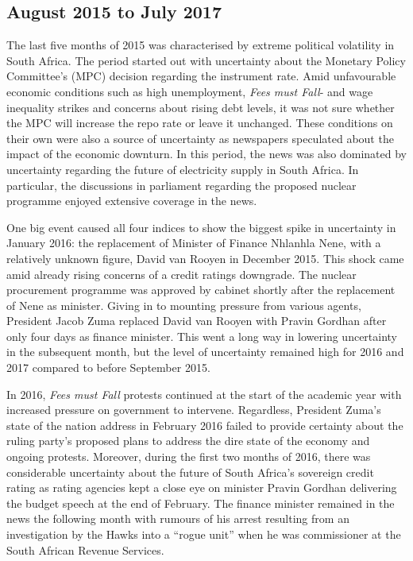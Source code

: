 \documentclass[11pt,preprint, authoryear]{elsarticle}
\numberwithin{equation}{section}
\numberwithin{figure}{section}
\numberwithin{table}{section}
\begin{document}
\subsection{August 2015 to July 2017}\label{ss_second_period}

The last five months of 2015 was characterised by extreme political
volatility in South Africa. The period started out with uncertainty
about the Monetary Policy Committee's (MPC) decision regarding the
instrument rate. Amid unfavourable economic conditions such as high
unemployment, \emph{Fees must Fall}- and wage inequality strikes and
concerns about rising debt levels, it was not sure whether the MPC will
increase the repo rate or leave it unchanged. These conditions on their
own were also a source of uncertainty as newspapers speculated about the
impact of the economic downturn. In this period, the news was also
dominated by uncertainty regarding the future of electricity supply in
South Africa. In particular, the discussions in parliament regarding the
proposed nuclear programme enjoyed extensive coverage in the news.

One big event caused all four indices to show the biggest spike in
uncertainty in January 2016: the replacement of Minister of Finance
Nhlanhla Nene, with a relatively unknown figure, David van Rooyen in December 2015. This
shock came amid already rising concerns of a credit ratings downgrade.
The nuclear procurement programme was approved by cabinet shortly after
the replacement of Nene as minister. Giving in to mounting pressure from
various agents, President Jacob Zuma replaced David van Rooyen with
Pravin Gordhan after only four days as finance minister. This went a
long way in lowering uncertainty in the subsequent month, but the level
of uncertainty remained high for 2016 and 2017 compared to before
September 2015.

In 2016, \emph{Fees must Fall} protests continued at the start of the
academic year with increased pressure on government to intervene.
Regardless, President Zuma's state of the nation address in February
2016 failed to provide certainty about the ruling party's proposed plans
to address the dire state of the economy and ongoing protests. Moreover,
during the first two months of 2016, there was considerable uncertainty
about the future of South Africa's sovereign credit rating as rating
agencies kept a close eye on minister Pravin Gordhan delivering the
budget speech at the end of February. The finance minister remained in
the news the following month with rumours of his arrest resulting from
an investigation by the Hawks into a ``rogue unit'' when he was
commissioner at the South African Revenue Services.
\end{document}
